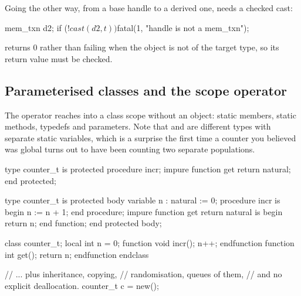 Going the other way, from a base handle to a derived one, needs a checked
cast:

\begin{svcode}
mem_txn d2;
if (!$cast(d2, t)) $fatal(1, "handle is not a mem_txn");
\end{svcode}

 returns 0 rather than failing when the object is not of the
target type, so its return value must be checked.

\subsection{Parameterised classes and the scope operator}


The \code{::} operator reaches into a class scope without an object: static
members, static methods, typedefs and parameters. Note that
 and  are
different types with separate static variables, which is a surprise the first
time a counter you believed was global turns out to have been counting two
separate populations.

\begin{rosetta}
\begin{rleft}
type counter_t is protected
  procedure incr;
  impure function get return natural;
end protected;

type counter_t is protected body
  variable n : natural := 0;
  procedure incr is begin
    n := n + 1;
  end procedure;
  impure function get return natural
  is begin return n; end function;
end protected body;
\end{rleft}
\begin{rright}
class counter_t;
  local int n = 0;
  function void incr(); n++; endfunction
  function int get(); return n; endfunction
endclass

// ... plus inheritance, copying,
// randomisation, queues of them,
// and no explicit deallocation.
counter_t c = new();
\end{rright}
\end{rosetta}

